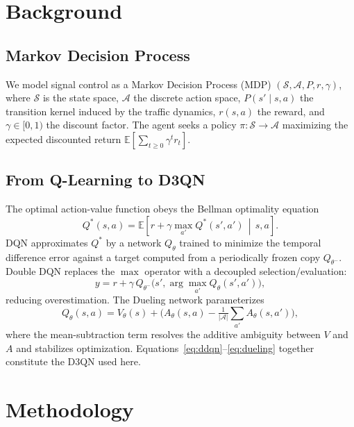 \documentclass[conference]{IEEEtran}
\begin{document}
\section{Background}
\label{sec:background}
\subsection{Markov Decision Process}
We model signal control as a Markov Decision Process (MDP)
$(\mathcal{S}, \mathcal{A}, P, r, \gamma)$, where $\mathcal{S}$ is the state
space, $\mathcal{A}$ the discrete action space, $P(s'\!\mid s,a)$ the transition
kernel induced by the traffic dynamics, $r(s,a)$ the reward, and
$\gamma \in [0,1)$ the discount factor. The agent seeks a policy
$\pi:\mathcal{S}\!\rightarrow\!\mathcal{A}$ maximizing the expected discounted
return $\mathbb{E}\!\left[\sum_{t\geq0}\gamma^{t} r_t\right]$.

\subsection{From Q-Learning to D3QN}
The optimal action-value function obeys the Bellman optimality equation
\begin{equation}
Q^{*}(s,a) = \mathbb{E}\!\left[ r + \gamma \max_{a'} Q^{*}(s',a') \,\middle|\, s,a \right].
\end{equation}
DQN approximates $Q^{*}$ by a network $Q_\theta$ trained to minimize the temporal
difference error against a target computed from a periodically frozen copy
$Q_{\theta^-}$. Double DQN replaces the $\max$ operator with a decoupled
selection/evaluation:
\begin{equation}
y = r + \gamma\, Q_{\theta^-}\!\big(s', \arg\max_{a'} Q_\theta(s',a')\big),
\label{eq:ddqn}
\end{equation}
reducing overestimation. The Dueling network parameterizes
\begin{equation}
Q_\theta(s,a) = V_\theta(s) + \Big( A_\theta(s,a) - \tfrac{1}{|\mathcal{A}|}\!\sum_{a'} A_\theta(s,a') \Big),
\label{eq:dueling}
\end{equation}
where the mean-subtraction term resolves the additive ambiguity between $V$ and
$A$ and stabilizes optimization. Equations~\eqref{eq:ddqn}--\eqref{eq:dueling}
together constitute the D3QN used here.

\section{Methodology}
\label{sec:method}
\end{document}
